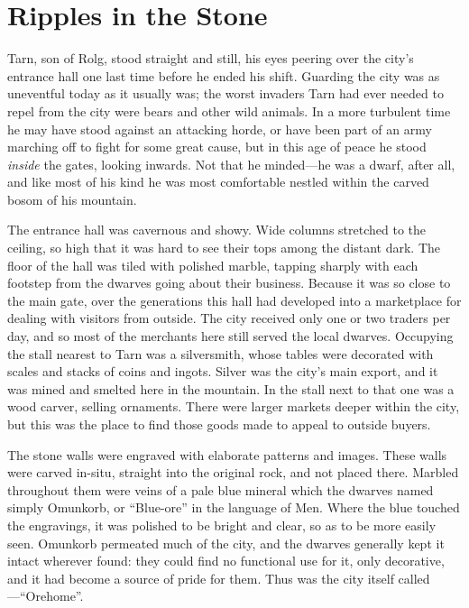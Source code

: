 \chapter{Ripples in the Stone}
Tarn, son of Rolg, stood straight and still, his eyes peering over the city's entrance hall one last time before he ended his shift.  Guarding the city was as uneventful today as it usually was; the worst invaders Tarn had ever needed to repel from the city were bears and other wild animals.  In a more turbulent time he may have stood against an attacking horde, or have been part of an army marching off to fight for some great cause, but in this age of peace he stood \emph{inside} the gates, looking inwards.  Not that he minded---he was a dwarf, after all, and like most of his kind he was most comfortable nestled within the carved bosom of his mountain.

The entrance hall was cavernous and showy.  Wide columns stretched to the ceiling, so high that it was hard to see their tops among the distant dark.  The floor of the hall was tiled with polished marble, tapping sharply with each footstep from the dwarves going about their business.  Because it was so close to the main gate, over the generations this hall had developed into a marketplace for dealing with visitors from outside.  The city received only one or two traders per day, and so most of the merchants here still served the local dwarves.  Occupying the stall nearest to Tarn was a silversmith, whose tables were decorated with scales and stacks of coins and ingots.  Silver was the city's main export, and it was mined and smelted here in the mountain.  In the stall next to that one was a wood carver, selling ornaments.  There were larger markets deeper within the city, but this was the place to find those goods made to appeal to outside buyers.

The stone walls were engraved with elaborate patterns and images.  These walls were carved in-situ, straight into the original rock, and not placed there.  Marbled throughout them were veins of a pale blue mineral which the dwarves named simply Omunkorb, or ``Blue-ore'' in the language of Men.  Where the blue touched the engravings, it was polished to be bright and clear, so as to be more easily seen.  Omunkorb permeated much of the city, and the dwarves generally kept it intact wherever found: they could find no functional use for it, only decorative, and it had become a source of pride for them.  Thus was the city itself called \korbarthrond---``Orehome''.

